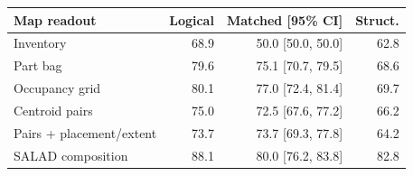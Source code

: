 \begin{tabular}{@{}lrrr@{}}
\toprule
Map readout & Logical & Matched [95\% CI] & Struct. \\
\midrule
Inventory & 68.9 & 50.0 [50.0, 50.0] & 62.8 \\
Part bag & 79.6 & 75.1 [70.7, 79.5] & 68.6 \\
Occupancy grid & 80.1 & 77.0 [72.4, 81.4] & 69.7 \\
Centroid pairs & 75.0 & 72.5 [67.6, 77.2] & 66.2 \\
Pairs + placement/extent & 73.7 & 73.7 [69.3, 77.8] & 64.2 \\
\midrule
SALAD composition & 88.1 & 80.0 [76.2, 83.8] & 82.8 \\
\bottomrule
\end{tabular}
